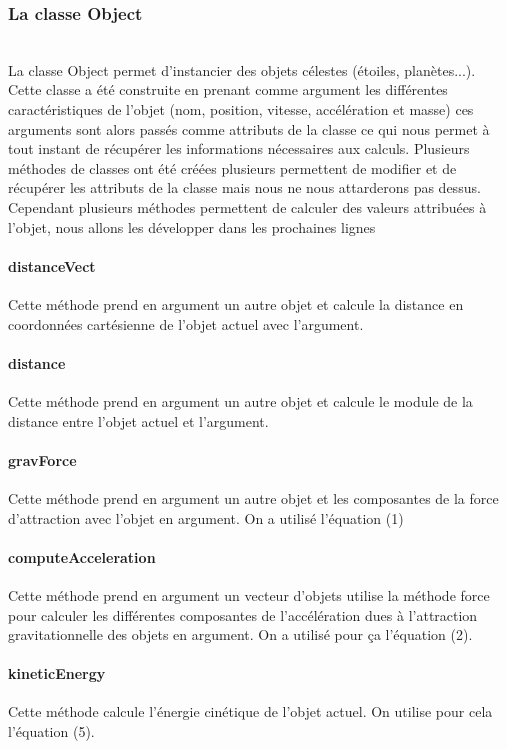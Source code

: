 \documentclass[11pt]{article}
\begin{document}
\subsubsection{La classe Object}
\\[2 mm]
La classe Object permet d'instancier des objets célestes (étoiles, planètes...). Cette classe a été construite en prenant comme argument les différentes caractéristiques de l'objet (nom, position, vitesse, accélération et masse) ces arguments sont alors passés comme attributs de la classe ce qui nous permet à tout instant de récupérer les informations nécessaires aux calculs. Plusieurs méthodes de classes ont été créées plusieurs permettent de modifier et de récupérer les attributs de la classe mais nous ne nous attarderons pas dessus. Cependant plusieurs méthodes permettent de calculer des valeurs attribuées à l'objet, nous allons les développer dans les prochaines lignes

\paragraph{distanceVect \break}
Cette méthode prend en argument un autre objet et calcule la distance en coordonnées cartésienne de l'objet actuel avec l'argument.

\paragraph{distance \break}
Cette méthode prend en argument un autre objet et calcule le module de la distance entre l'objet actuel et l'argument.

\paragraph{gravForce \break}
Cette méthode prend en argument un autre objet et les composantes de la force d'attraction avec l'objet en argument. On a utilisé l'équation (1)

\paragraph{computeAcceleration \break} 
Cette méthode prend en argument un vecteur d'objets utilise la méthode force pour calculer les différentes composantes de l'accélération dues à l'attraction gravitationnelle des objets en argument. On a utilisé pour ça l'équation (2).

\paragraph{kineticEnergy \break}
Cette méthode calcule l'énergie cinétique de l'objet actuel. On utilise pour cela l'équation (5).
\end{document}
